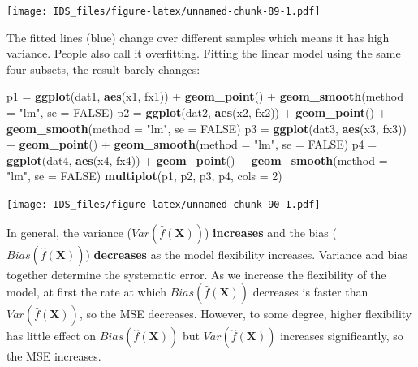 \documentclass[12pt,]{krantz}
\newenvironment{Shaded}{\begin{snugshade}}{\end{snugshade}}
\newcommand{\KeywordTok}[1]{\textcolor[rgb]{0.13,0.29,0.53}{\textbf{{#1}}}}
\newcommand{\DataTypeTok}[1]{\textcolor[rgb]{0.13,0.29,0.53}{{#1}}}
\newcommand{\DecValTok}[1]{\textcolor[rgb]{0.00,0.00,0.81}{{#1}}}
\newcommand{\StringTok}[1]{\textcolor[rgb]{0.31,0.60,0.02}{{#1}}}
\newcommand{\OtherTok}[1]{\textcolor[rgb]{0.56,0.35,0.01}{{#1}}}
\newcommand{\NormalTok}[1]{{#1}}
\theoremstyle{definition}
\theoremstyle{definition}
\theoremstyle{remark}
\begin{document}
\texttt{[image: IDS\_files/figure-latex/unnamed-chunk-89-1.pdf]}

The fitted lines (blue) change over different samples which means it has
high variance. People also call it overfitting. Fitting the linear model
using the same four subsets, the result barely changes:

\begin{Shaded}
\begin{Highlighting}[]
\NormalTok{p1 =}\StringTok{ }\KeywordTok{ggplot}\NormalTok{(dat1, }\KeywordTok{aes}\NormalTok{(x1, fx1)) +}\StringTok{ }\KeywordTok{geom_point}\NormalTok{() +}\StringTok{ }\KeywordTok{geom_smooth}\NormalTok{(}\DataTypeTok{method =} \StringTok{"lm"}\NormalTok{, }
    \DataTypeTok{se =} \OtherTok{FALSE}\NormalTok{)}
\NormalTok{p2 =}\StringTok{ }\KeywordTok{ggplot}\NormalTok{(dat2, }\KeywordTok{aes}\NormalTok{(x2, fx2)) +}\StringTok{ }\KeywordTok{geom_point}\NormalTok{() +}\StringTok{ }\KeywordTok{geom_smooth}\NormalTok{(}\DataTypeTok{method =} \StringTok{"lm"}\NormalTok{, }
    \DataTypeTok{se =} \OtherTok{FALSE}\NormalTok{)}
\NormalTok{p3 =}\StringTok{ }\KeywordTok{ggplot}\NormalTok{(dat3, }\KeywordTok{aes}\NormalTok{(x3, fx3)) +}\StringTok{ }\KeywordTok{geom_point}\NormalTok{() +}\StringTok{ }\KeywordTok{geom_smooth}\NormalTok{(}\DataTypeTok{method =} \StringTok{"lm"}\NormalTok{, }
    \DataTypeTok{se =} \OtherTok{FALSE}\NormalTok{)}
\NormalTok{p4 =}\StringTok{ }\KeywordTok{ggplot}\NormalTok{(dat4, }\KeywordTok{aes}\NormalTok{(x4, fx4)) +}\StringTok{ }\KeywordTok{geom_point}\NormalTok{() +}\StringTok{ }\KeywordTok{geom_smooth}\NormalTok{(}\DataTypeTok{method =} \StringTok{"lm"}\NormalTok{, }
    \DataTypeTok{se =} \OtherTok{FALSE}\NormalTok{)}
\KeywordTok{multiplot}\NormalTok{(p1, p2, p3, p4, }\DataTypeTok{cols =} \DecValTok{2}\NormalTok{)}
\end{Highlighting}
\end{Shaded}

\texttt{[image: IDS\_files/figure-latex/unnamed-chunk-90-1.pdf]}

In general, the variance (\(Var(\hat{f}(\mathbf{X}))\))
\textbf{increases} and the bias (\(Bias(\hat{f}(\mathbf{X}))\))
\textbf{decreases} as the model flexibility increases. Variance and bias
together determine the systematic error. As we increase the flexibility
of the model, at first the rate at which \(Bias(\hat{f}(\mathbf{X}))\)
decreases is faster than \(Var (\hat{f} (\mathbf{X}))\), so the MSE
decreases. However, to some degree, higher flexibility has little effect
on \(Bias(\hat{f}(\mathbf{X}))\) but \(Var(\hat{f} (\mathbf{X}))\)
increases significantly, so the MSE increases.
\end{document}
